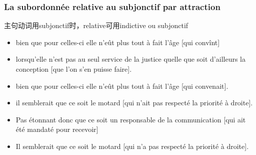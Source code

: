 \documentclass[UTF8]{report}
\begin{document}
\subsubsection{La subordonnée relative au subjonctif par attraction}
主句动词用subjonctif时，relative可用indictive ou subjonctif
\begin{itemize}
    \item bien que pour celles-ci elle n’eût plus tout à fait l’âge [qui convînt]
    \item lorsqu’elle n’est pas au seul service de la justice quelle que soit d’ailleurs la conception [que l’on s’en puisse faire].
    \item bien que pour celles-ci elle n’eût plus tout à fait l’âge [qui convenait].
    \item il semblerait que ce soit le motard [qui n’ait pas respecté la priorité à droite].
    \item Pas étonnant donc que ce soit un responsable de la communication [qui ait été mandaté pour recevoir]
    \item Il semblerait que ce soit le motard [qui n’a pas respecté la priorité à droite].
\end{itemize}
\end{document}
